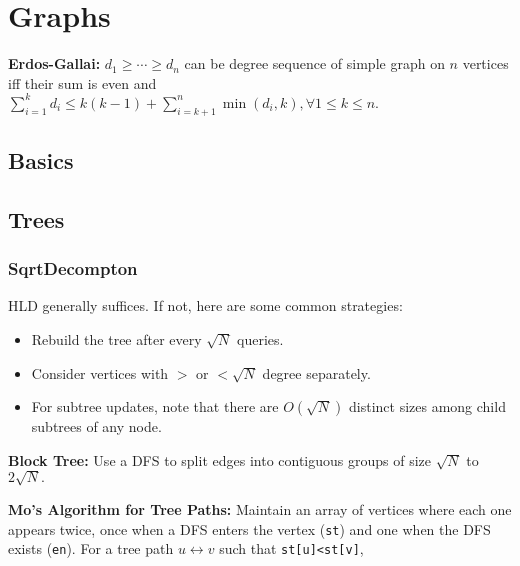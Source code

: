 \chapter{Graphs}

\textbf{Erdos-Gallai:} $d_1\geq\cdots\geq d_n$ can be degree sequence of simple graph on $n$ vertices iff their sum is even and $\sum_{i=1}^{k}d_{i}\leq k(k-1)+\sum _{i=k+1}^{n}\min(d_{i},k), \forall 1\le k\le n.$

\section{Basics}

\section{Trees}

	\subsection{SqrtDecompton}

		HLD generally suffices. If not, here are some common strategies:
		
		\begin{itemize}
			\item Rebuild the tree after every $\sqrt N$ queries. %
			\item Consider vertices with $>$ or $<\sqrt N$ degree separately. %
			\item For subtree updates, note that there are $O(\sqrt N)$ distinct sizes among child subtrees of any node.
		\end{itemize}

		\textbf{Block Tree:} Use a DFS to split edges into contiguous groups of size $\sqrt N$ to $2\sqrt N.$

		\textbf{Mo's Algorithm for Tree Paths:} Maintain an array of vertices where each one appears twice, once when a DFS enters the vertex (\texttt{st}) and one when the DFS exists (\texttt{en}). For a tree path $u\leftrightarrow v$ such that \texttt{st[u]<st[v]},

